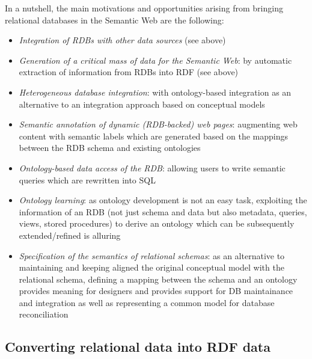 \documentclass[11pt]{llncs}
\newcommand{\labelsec}[1]{\label{sec:#1}}
\begin{document}
In a nutshell, the main motivations and opportunities arising 
from bringing relational databases in the Semantic Web \cite{bringingRDBS} are the following:
\begin{itemize}
 \item \emph{Integration of RDBs with other data sources} (see above)
 \item \emph{Generation of a critical mass of data for the Semantic Web}: 
 by automatic extraction of information from RDBs into RDF (see above)
 \item \emph{Heterogeneous database integration}: with ontology-based integration as an alternative to an integration approach
  based on conceptual models
 \item \emph{Semantic annotation of dynamic (RDB-backed) web pages}: augmenting web content with semantic labels 
  which are generated based on the mappings between the RDB schema and existing ontologies
 \item \emph{Ontology-based data access of the RDB}: allowing users to write semantic queries which are rewritten into SQL
 \item \emph{Ontology learning}: as ontology development is not an easy task, exploiting the information of an RDB (not just 
  schema and data but also metadata, queries, views, stored procedures) to derive an ontology which can be subsequently 
  extended/refined is alluring
 \item \emph{Specification of the semantics of relational schemas}: as an alternative to maintaining and  keeping aligned 
  the original conceptual model with the relational schema, defining a mapping between the schema and an ontology
  provides meaning for designers and provides support for DB maintainance and integration as well as representing 
  a common model for database reconciliation
\end{itemize}


\subsection{Converting relational data into RDF data}
\labelsec{rdfDataManagement}
\end{document}
